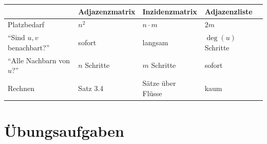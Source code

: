 \begin{merksatz}
\begin{center}
{\small
\renewcommand{\arraystretch}{1.5}
\begin{tabular}{@{}P{2.4cm}P{2.0cm}P{2.2cm}P{2.0cm}@{}}
\toprule
& \textbf{Adjazenz\-matrix} & \textbf{Inzidenz\-matrix} & \textbf{Adjazenz\-liste}\\
\midrule
Platzbedarf & $n^2$ & $n \cdot m$ & $2m$\\
\enquote{Sind $u,v$ benachbart?} & \textcolor{gruen}{sofort} & \textcolor{akzent}{langsam} & $\deg(u)$ Schritte\\
\enquote{Alle Nachbarn von $u$?} & $n$ Schritte & \textcolor{akzent}{$m$ Schritte} & \textcolor{gruen}{sofort}\\
Rechnen & \textcolor{gruen}{Satz 3.4} & Sätze über Flüsse & \textcolor{akzent}{kaum}\\
\bottomrule
\end{tabular}}
\end{center}

\begin{center}
\begin{minipage}{0.88\textwidth}
\end{minipage}
\end{center}
\end{merksatz}

\section{Übungsaufgaben}

